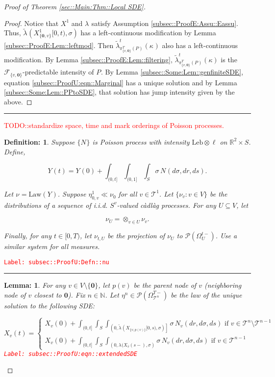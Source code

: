 \documentclass[12pt]{article}
\newcommand{\mb}{\mathbb}
\newcommand{\mc}{\mathcal}
\newcommand{\ov}{\overline}
\newcommand{\te}{\text}
\newcommand{\tr}{\textcolor{red}}
\newcommand{\labe}[1]{\tr{\texttt{Label: #1}}}
\newcommand{\lin}{\rule{\linewidth}{0.4 pt}}
\newcommand{\pmsr}{\mc{P}}							%
\renewcommand{\root}{\mathbf{0}}				%
\renewcommand{\v}{v}							%
\renewcommand{\U}{U}							%
\newcommand{\cl}{\ov}							%
\renewcommand{\S}{S}							%
\newcommand{\s}{\sigma}							%
\newcommand{\T}{T}								%
\newcommand{\OmegaV}[2]{\Omega_{#1}^{#2}}		%
\renewcommand{\t}{t}							%
\newcommand{\poiss}[1]{N_{#1}}						%
\newcommand{\law}{\te{Law}}							%
\newcommand{\leb}{\te{Leb}}							%
\newcommand{\pup}[1]{^{#1}}							%
\newcommand{\tree}{\mc{T}}							%
\newcommand{\V}{V}									%
\renewcommand{\tt}{s}								%
\renewcommand{\r}{r}								%
\newcommand{\numb}{n}								%
\newcommand{\piV}[2]{\pi_{#1}^{#2}}					%
\newcommand{\rxvt}[2]{X_{#1}{(#2)}}					%
\newcommand{\rxvtt}[2]{Y_{#1}{(#2)}}				%
\newcommand{\rxvts}[2]{X_{#1}{#2}}					%
\newcommand{\rxvtsn}[3]{X_{#1}^{#3}{#2}}			%
\newcommand{\rxvtts}[2]{Y_{#1}{#2}}					%
\newcommand{\rp}[1]{P^{#1}}							%
\newcommand{\mm}[3]{\nu_{#2#1}^{#3}}						%
\newcommand{\mmm}[3]{\eta_{#2#1}^{#3}}						%
\newcommand{\rate}[1]{\lambda_{#1}}					%
\newcommand{\crate}[2]{\alt{\lambda}_{#1}^{#2}}		%
\newcommand{\F}[2]{\mc{F}_{#1}^{#2}}				%
\newcommand{\Sm}{\ell}								%
\newcommand{\alt}{\widetilde}						%
\renewcommand{\mark}[1]{\kappa^{#1}}				%
\newcommand{\p}[1]{p(#1)}						%
\newtheorem{lem}[thms]{Lemma: }
\newtheorem{defn}[thms]{Definition: }
\begin{document}
\begin{proof}[Proof of Theorem \ref{sec::Main:Thm::Local SDE}]
\begin{proof}
Notice that \(\rxvtsn{}{}{1}\) and \(\rate{}\) satisfy Assumption \ref{subsec::ProofE:Assu::Eassu}. Thus, \(\crate{}{}(\rxvtsn{\{\root,\v\}}{[0,\t)}{1},\s)\) has a left-continuous modification by Lemma \ref{subsec::ProofE:Lem::leftmod}. Then \(\crate{\piV{\{\v,\root\}}{\T}(\rp{})}{\t}(\mark{})\) also has a left-continuous modification. By Lemma \ref{subsec::ProofE:Lem::filtering}, \(\crate{\piV{\{\v,\root\}}{\T}(\rp{})}{\t}(\kappa)\) is the \(\F{\{\v,\root\}}{}\)-predictable intensity of \(\rp{}\). By Lemma \ref{subsec::Some:Lem::genfiniteSDE}, equation \eqref{subsec::ProofU:eqn::Marginal} has a unique solution and by Lemma \ref{subsec::Some:Lem::PPtoSDE}, that solution has jump intensity given by the above.

\end{proof}

\lin

\tr{TODO::standardize space, time and mark orderings of Poisson processes.}

\begin{defn}
Suppose \(\{\poiss{}\}\) is Poisson process with intensity \(\leb\otimes \Sm\) on \(\mb{R}^2\times \S\). Define,

\[\rxvtt{}{\t} = \rxvtt{}{0} + \int_{(0,\t]}\int_{(0,1]}\int_\S\s\,\poiss{}(d\s,d\r,d\tt).\]

Let \(\mm{}{}{} = \law(\rxvtts{}{})\). Suppose \(\mmm{\v}{0,}{1}\ll\mm{}{0}{}\) for all \(\v\in\tree\pup{1}\). Let \(\{\mm{\v}{}{}:\v\in\V\}\) be the distributions of a sequence of i.i.d. \(\S^{\v}\)-valued c\`adl\`ag processes. For any \(\U\subseteq \V\), let 

\[\mm{\U}{}{} = \otimes_{\v\in\U} \mm{\v}{}{}.\]

Finally, for any \(\t\in [0,\T)\), let \(\mm{\U}{\t,}{}\) be the projection of \(\mm{\U}{}{}\) to \(\pmsr(\OmegaV{\U}{\t-})\). Use a similar system for all measures.
\label{subsec::ProofU:Defn::nu}
\end{defn}
\labe{subsec::ProofU:Defn::nu}

\lin

\begin{lem}
For any \(\v \in \V\setminus\{\root\}\), let \(\p{\v}\) be the parent node of \(\v\) (neighboring node of \(\v\) closest to \(\root\)). Fix \(\numb \in \mb{N}\). Let \(\mmm{}{}{\numb} \in \pmsr\left(\OmegaV{\tree\pup{\numb}}{\T-}\right)\) be the law of the unique solution to the following SDE:

\begin{equation}
\rxvt{\v}{\t} = \begin{cases}
\rxvt{\v}{0} + \int_{(0,\t]}\int_\S\int_{\left(0,\crate{}{}(\rxvts{\{\v,\p{\v}\}}{[0,\tt)},\s)\right]}\s\,\poiss{\v}(d\r,d\s,d\tt)\te{ if } \v \in \tree\pup{\numb}\setminus \tree\pup{\numb-1}\\
\rxvt{\v}{0} + \int_{(0,\t]}\int_\S\int_{\left(0,\rate{}(\rxvt{\cl{\v}}{\tt-},\s\right)}\s\,\poiss{\v}(d\r,d\s,d\tt)\te{ if } \v \in \tree\pup{\numb-1}
\end{cases}
\label{subsec::ProofU:eqn::extendedSDE}
\end{equation}
\labe{subsec::ProofU:eqn::extendedSDE}


\end{lem}
\end{proof}
\end{document}

